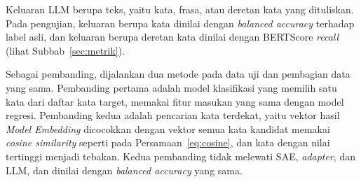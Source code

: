 Keluaran LLM berupa teks, yaitu kata, frasa, atau deretan kata yang dituliskan.
Pada pengujian, keluaran berupa kata dinilai dengan \textit{balanced accuracy} terhadap label asli, dan keluaran berupa deretan kata dinilai dengan BERTScore \textit{recall} (lihat Subbab~\ref{sec:metrik}).

Sebagai pembanding, dijalankan dua metode pada data uji dan pembagian data yang sama.
Pembanding pertama adalah model klasifikasi yang memilih satu kata dari daftar kata target, memakai fitur masukan yang sama dengan model regresi.
Pembanding kedua adalah pencarian kata terdekat, yaitu vektor hasil \textit{Model Embedding} dicocokkan dengan vektor semua kata kandidat memakai \textit{cosine similarity} seperti pada Persamaan~\ref{eq:cosine}, dan kata dengan nilai tertinggi menjadi tebakan.
Kedua pembanding tidak melewati SAE, \textit{adapter}, dan LLM, dan dinilai dengan \textit{balanced accuracy} yang sama.
